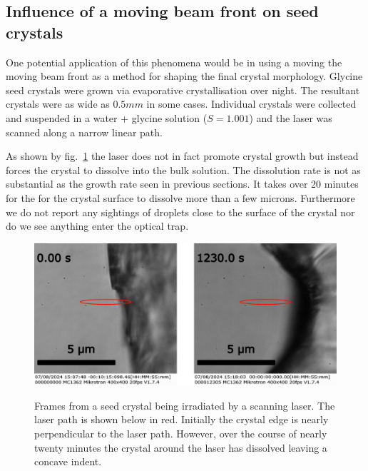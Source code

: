 \newpage

\subsection{Influence of a moving beam front on seed crystals}
One potential application of this phenomena would be in using a 
moving the moving beam front as a method for shaping the final
crystal morphology. Glycine seed crystals were grown via 
evaporative crystallisation over night. The resultant crystals
were as wide as $0.5 mm$ in some cases. Individual crystals were 
collected and suspended in a water + glycine solution ($S = 1.001$)
and the laser was scanned along a narrow linear path. 

As shown by fig.~\ref{fig:seed_crystals} the laser does not in fact 
promote crystal growth but instead forces the crystal to dissolve 
into the bulk solution. The dissolution rate is not as substantial 
as the growth rate seen in previous sections. It takes over 20 
minutes for the for the crystal surface to dissolve more than a 
few microns. Furthermore we do not report any sightings of droplets
close to the surface of the crystal nor do we see anything enter the 
optical trap.
\begin{figure}[h!]
	\centering
	\includegraphics[width=\linewidth]{seed_crystals.pdf}
	\label{fig:seed_crystals}
	\caption{Frames from a seed crystal being irradiated by a scanning
		laser. The laser path is shown below in red. Initially the 
		crystal edge is nearly perpendicular to the laser path. However,
		over the course of nearly twenty minutes the crystal around the 
		laser has dissolved leaving a concave indent.}
\end{figure}

